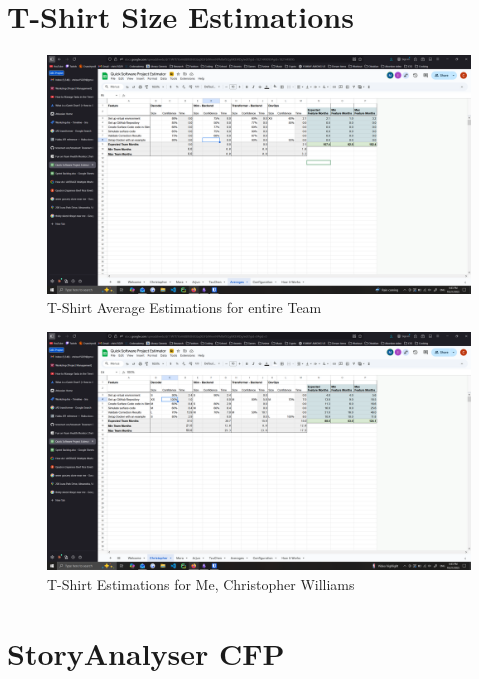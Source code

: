 \documentclass[12pt]{article}
\begin{document}
\section{T-Shirt Size Estimations}

\begin{figure}[H]
    \centering
    \includegraphics[width=0.75\linewidth]{images/tshirt_sizes_q8.png}
    \caption{T-Shirt Average Estimations for entire Team}
    \label{fig:q8}
\end{figure}

\begin{figure}[H]
    \centering
    \includegraphics[width=0.75\linewidth]{images/tshirt_sizes_personal_q8.png}
    \caption{T-Shirt Estimations for Me, Christopher Williams}
    \label{fig:q82}
\end{figure}

\section{StoryAnalyser CFP}

\end{document}
